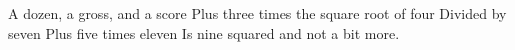 \documentclass[letterpaper,10pt,english]{jupyterBook}
\begin{document}
\begin{DUlineblock}{0em}
\item[] 
\end{DUlineblock}

\sphinxAtStartPar
A dozen, a gross, and a score
Plus three times the square root of four
Divided by seven
Plus five times eleven
Is nine squared and not a bit more.







\renewcommand{\indexname}{Index}
\printindex
\end{document}
